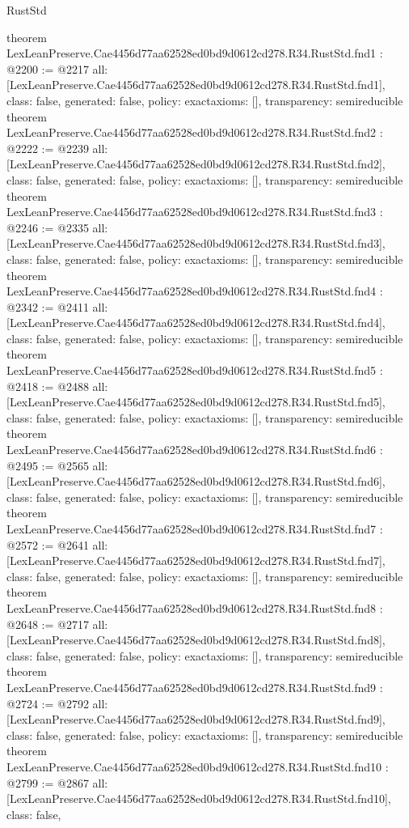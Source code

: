 \begin{lexlean}{RustStd}
\begin{coremodule}
{}
theorem LexLeanPreserve.Cae4456d77aa62528ed0bd9d0612cd278.R34.RustStd.fnd1 : @2200 := @2217 {
  all: [LexLeanPreserve.Cae4456d77aa62528ed0bd9d0612cd278.R34.RustStd.fnd1],
  class: false,
  generated: false,
  policy: exact{axioms: []},
  transparency: semireducible
}
theorem LexLeanPreserve.Cae4456d77aa62528ed0bd9d0612cd278.R34.RustStd.fnd2 : @2222 := @2239 {
  all: [LexLeanPreserve.Cae4456d77aa62528ed0bd9d0612cd278.R34.RustStd.fnd2],
  class: false,
  generated: false,
  policy: exact{axioms: []},
  transparency: semireducible
}
theorem LexLeanPreserve.Cae4456d77aa62528ed0bd9d0612cd278.R34.RustStd.fnd3 : @2246 := @2335 {
  all: [LexLeanPreserve.Cae4456d77aa62528ed0bd9d0612cd278.R34.RustStd.fnd3],
  class: false,
  generated: false,
  policy: exact{axioms: []},
  transparency: semireducible
}
theorem LexLeanPreserve.Cae4456d77aa62528ed0bd9d0612cd278.R34.RustStd.fnd4 : @2342 := @2411 {
  all: [LexLeanPreserve.Cae4456d77aa62528ed0bd9d0612cd278.R34.RustStd.fnd4],
  class: false,
  generated: false,
  policy: exact{axioms: []},
  transparency: semireducible
}
theorem LexLeanPreserve.Cae4456d77aa62528ed0bd9d0612cd278.R34.RustStd.fnd5 : @2418 := @2488 {
  all: [LexLeanPreserve.Cae4456d77aa62528ed0bd9d0612cd278.R34.RustStd.fnd5],
  class: false,
  generated: false,
  policy: exact{axioms: []},
  transparency: semireducible
}
theorem LexLeanPreserve.Cae4456d77aa62528ed0bd9d0612cd278.R34.RustStd.fnd6 : @2495 := @2565 {
  all: [LexLeanPreserve.Cae4456d77aa62528ed0bd9d0612cd278.R34.RustStd.fnd6],
  class: false,
  generated: false,
  policy: exact{axioms: []},
  transparency: semireducible
}
theorem LexLeanPreserve.Cae4456d77aa62528ed0bd9d0612cd278.R34.RustStd.fnd7 : @2572 := @2641 {
  all: [LexLeanPreserve.Cae4456d77aa62528ed0bd9d0612cd278.R34.RustStd.fnd7],
  class: false,
  generated: false,
  policy: exact{axioms: []},
  transparency: semireducible
}
theorem LexLeanPreserve.Cae4456d77aa62528ed0bd9d0612cd278.R34.RustStd.fnd8 : @2648 := @2717 {
  all: [LexLeanPreserve.Cae4456d77aa62528ed0bd9d0612cd278.R34.RustStd.fnd8],
  class: false,
  generated: false,
  policy: exact{axioms: []},
  transparency: semireducible
}
theorem LexLeanPreserve.Cae4456d77aa62528ed0bd9d0612cd278.R34.RustStd.fnd9 : @2724 := @2792 {
  all: [LexLeanPreserve.Cae4456d77aa62528ed0bd9d0612cd278.R34.RustStd.fnd9],
  class: false,
  generated: false,
  policy: exact{axioms: []},
  transparency: semireducible
}
theorem LexLeanPreserve.Cae4456d77aa62528ed0bd9d0612cd278.R34.RustStd.fnd10 : @2799 := @2867 {
  all: [LexLeanPreserve.Cae4456d77aa62528ed0bd9d0612cd278.R34.RustStd.fnd10],
  class: false,
}
\end{coremodule}
\end{lexlean}
